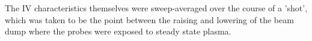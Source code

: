 \documentclass[a4paper, 12pt]{article} %
\begin{document}
	The IV characteristics themselves were sweep-averaged over the course of a 'shot', which was taken to be the point between the raising and lowering of the beam dump where the probes were exposed to steady state plasma. 
	
	
	
\end{document}

